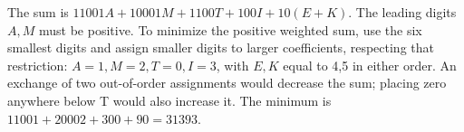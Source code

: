 The sum is $11001A+10001M+1100T+100I+10(E+K)$. The leading digits $A,M$ must be positive. To minimize the positive weighted sum, use the six smallest digits and assign smaller digits to larger coefficients, respecting that restriction: $A=1,M=2,T=0,I=3$, with $E,K$ equal to 4,5 in either order. An exchange of two out-of-order assignments would decrease the sum; placing zero anywhere below T would also increase it. The minimum is $11001+20002+300+90=\boxed{31393}$.
